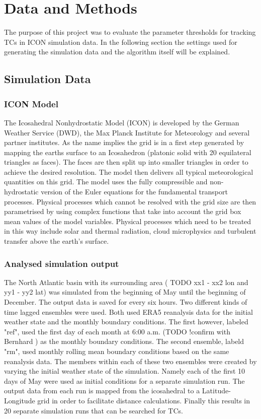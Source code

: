 \chapter{Data and Methods}
\label{sec:methods}
The purpose of this project was to evaluate the parameter thresholds for
tracking TCs in ICON simulation data. In the following section the settings
used for generating the simulation data and the algorithm itself will be
explained.
\section{Simulation Data}
\label{sec:data}
\subsection*{ICON Model}
The Icosahedral Nonhydrostatic Model (ICON) is developed by the German Weather
Service (DWD), the Max Planck Institute for Meteorology and several partner
institutes. As the name implies the grid is in a first step generated by
mapping the earths surface to an Icosahedron (platonic solid with 20
equilateral triangles as faces). The faces are then split up into smaller
triangles in order to achieve the desired resolution. The model then delivers
all typical meteorological quantities on this grid.
The model uses the fully compressible and non-hydrostatic version of the Euler
equations for the fundamental transport processes. Physical processes which
cannot be resolved with the grid size are then parametrised by using complex
functions that take into account the grid box mean values of the model
variables. Physical processes which need to be treated in this way include
solar and thermal radiation, cloud microphysics and turbulent transfer above
the earth's surface.\cite{dwd-icon}

\subsection*{Analysed simulation output}
The North Atlantic basin with its surrounding area ( TODO xx1 - xx2 lon and yy1
- yy2 lat) %
was simulated from the beginning of May until the beginning of December. The
output data is saved for every six hours.
Two different kinds of time lagged ensembles were used. Both used ERA5
reanalysis data for the initial weather state and the monthly boundary
conditions. The first however, labeled "ref", used the first day of each month
at 6:00 a.m. (TODO !confirm with Bernhard ) %
as the monthly boundary conditions. The second ensemble, labeld "rm", used
monthly rolling mean boundary conditions based on the same reanalysis data.
The members within each of these two ensembles were created by varying the
initial weather state of the simulation. Namely each of the first 10 days of
May were used as initial conditions for a separate simulation run.
The output data from each run is mapped from the icosahedral to a
Latitude-Longitude grid in order to facilitate distance calculations.
Finally this results in 20 separate simulation runs that can be searched for
TCs.

